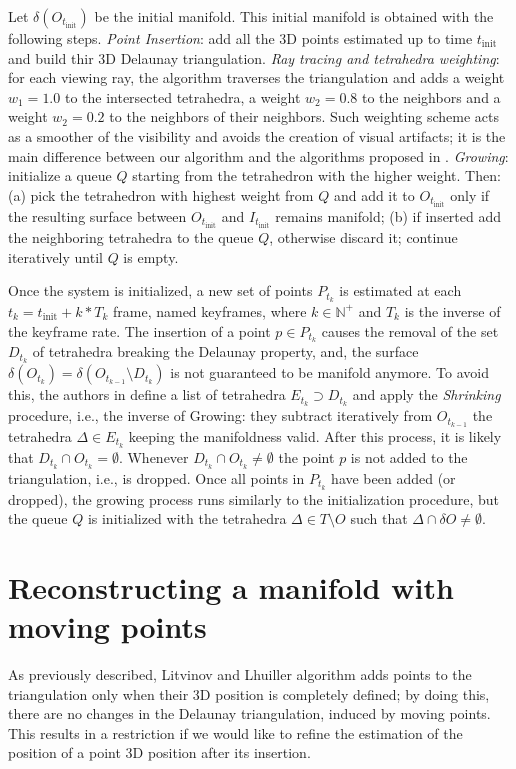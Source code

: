 Let  $\delta (O_{t_{\text{init}}})$ be the initial manifold. This initial manifold is obtained with the following steps. \emph{Point Insertion}: add all the 3D points estimated up to time $t_{\text{init}}$ and build thir 3D Delaunay triangulation. \emph{Ray tracing and tetrahedra weighting}: for each viewing ray, the algorithm traverses the triangulation and adds a weight $w_1 = 1.0$ to the intersected tetrahedra, a weight $w_2 = 0.8$ to the neighbors and a weight $w_2 = 0.2$ to the neighbors of their neighbors. 
Such weighting scheme acts as a smoother of the visibility and avoids the creation of visual artifacts; it is the main difference between our algorithm and the algorithms proposed in \cite{litvinov_lhuillier_13,litvinov_Lhiuller14}. \emph{Growing}: initialize a queue $Q$ starting from the tetrahedron with the higher weight. Then: (a) pick  the tetrahedron with highest weight from $Q$ and add it to $O_{t_{\text{init}}}$ only if the resulting surface between $O_{t_{\text{init}}}$ and $I_{t_{\text{init}}}$ remains manifold; (b) if inserted  add the neighboring tetrahedra to the queue $Q$, otherwise discard it; continue iteratively until $Q$ is empty.

Once the system is initialized, a new set of points $P_{t_k}$ is estimated at each $t_k= t_{\text{init}} + k*T_k$ frame, named keyframes, where $k \in \mathbb{N^+}$ and $T_k$ is the inverse of the keyframe rate. 
The insertion of a point $p\in P_{t_k}$ causes the removal of the set $D_{t_k}$ of tetrahedra breaking the Delaunay property, and, the surface $\delta (O_{t_k}) = \delta (O_{t_{k-1}} \setminus D_{t_k})$ is not guaranteed to be manifold anymore. 
To avoid this, the authors in \cite{litvinov_lhuillier_13} define a list of tetrahedra $E_{t_k} \supset D_{t_k}$ and apply the \emph{Shrinking} procedure, i.e., the inverse of Growing:  they subtract iteratively from $O_{t_{k-1}}$ the tetrahedra  $\Delta \in E_{t_k}$ keeping the manifoldness valid.
After this process, it is likely that $D_{t_k} \cap O_{t_k} = \emptyset$. Whenever $D_{t_k} \cap O_{t_k} \neq \emptyset$ the point $p$ is not added to the triangulation, i.e., is dropped.
Once all points in $P_{t_k}$ have been added (or dropped), the growing process runs similarly to the initialization procedure, but the queue $Q$ is initialized with the tetrahedra $\Delta \in T \setminus O$ such that  $\Delta \cap \delta O \neq \emptyset$.

\section{Reconstructing a manifold with moving points}
\label{sec:3D-Reconstruction_2}
As previously described, Litvinov and Lhuiller \cite{litvinov_lhuillier_13} algorithm adds points to the triangulation only when their 3D position is completely defined; by doing this, there are no changes in the Delaunay triangulation, induced by moving points. This  results in a restriction if we would like to refine the estimation of the position of a point 3D position after its insertion.

